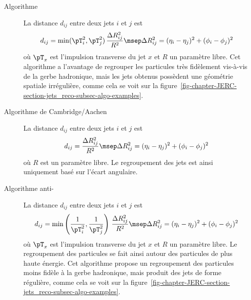 \begin{description}
\item[Algorithme \kT] La distance $d_{ij}$ entre deux jets $i$ et $j$ est
\begin{equation}
d_{ij} = \min({\pT}_i^2, {\pT}_j^2) \, \frac{\Delta R_{ij}^2}{R^2}
\msep
\Delta R_{ij}^2 = (\eta_i-\eta_j)^2 + (\phi_i-\phi_j)^2
\end{equation}
où ${\pT}_x$ est l'impulsion transverse du jet $x$ et $R$ un paramètre libre.
Cet algorithme a l'avantage de regrouper les particules très fidèlement vis-à-vis de la gerbe hadronique, mais les jets obtenus possèdent une géométrie spatiale irrégulière, comme cela se voit sur la figure~\ref{fig-chapter-JERC-section-jets_reco-subsec-algo-examples}.
\item[Algorithme de Cambridge/Aachen] La distance $d_{ij}$ entre deux jets $i$ et $j$ est
\begin{equation}
d_{ij} = \frac{\Delta R_{ij}^2}{R^2}
\msep
\Delta R_{ij}^2 = (\eta_i-\eta_j)^2 + (\phi_i-\phi_j)^2
\end{equation}
où $R$ est un paramètre libre. Le regroupement des jets est ainsi uniquement basé sur l'écart angulaire.
\item[Algorithme anti-\kT~\cite{Cacciari_antikT}] La distance $d_{ij}$ entre deux jets $i$ et $j$ est
\begin{equation}
d_{ij} = \min\left(\frac{1}{{\pT}_i^2}, \frac{1}{{\pT}_j^2}\right) \, \frac{\Delta R_{ij}^2}{R^2}
\msep
\Delta R_{ij}^2 = (\eta_i-\eta_j)^2 + (\phi_i-\phi_j)^2
\end{equation}
où ${\pT}_x$ est l'impulsion transverse du jet $x$ et $R$ un paramètre libre.
Le regroupement des particules se fait ainsi autour des particules de plus haute énergie.
Cet algorithme propose un regroupement des particules moins fidèle à la gerbe hadronique, mais produit des jets de forme régulière, comme cela se voit sur la figure~\ref{fig-chapter-JERC-section-jets_reco-subsec-algo-examples}.
\end{description}
